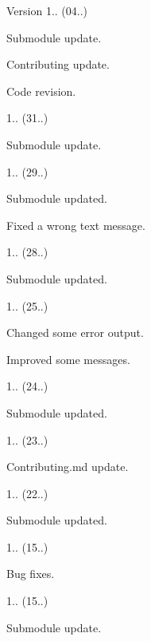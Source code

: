\begin{DoxyVersion}{Version}
1.. (04..)
\begin{DoxyItemize}
\item Submodule update.
\item Contributing update.
\item Code revision. 
\end{DoxyItemize}

1.. (31..)
\begin{DoxyItemize}
\item Submodule update. 
\end{DoxyItemize}

1.. (29..)
\begin{DoxyItemize}
\item Submodule updated.
\item Fixed a wrong text message. 
\end{DoxyItemize}

1.. (28..)
\begin{DoxyItemize}
\item Submodule updated. 
\end{DoxyItemize}

1.. (25..)
\begin{DoxyItemize}
\item Changed some error output.
\item Improved some messages. 
\end{DoxyItemize}

1.. (24..)
\begin{DoxyItemize}
\item Submodule updated. 
\end{DoxyItemize}

1.. (23..)
\begin{DoxyItemize}
\item Contributing.\+md update. 
\end{DoxyItemize}

1.. (22..)
\begin{DoxyItemize}
\item Submodule updated. 
\end{DoxyItemize}

1.. (15..)
\begin{DoxyItemize}
\item Bug fixes. 
\end{DoxyItemize}

1.. (15..)
\begin{DoxyItemize}
\item Submodule update. 
\end{DoxyItemize}


\end{DoxyVersion}
